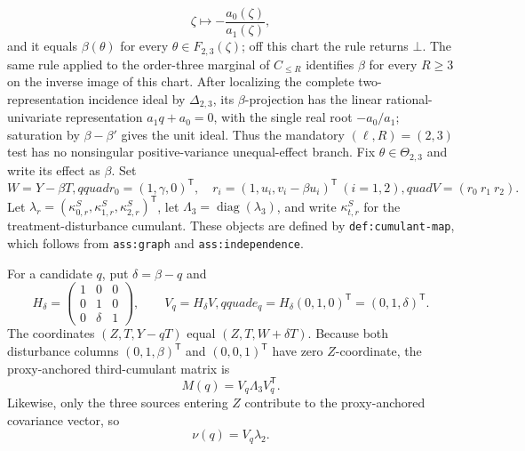 \[
 \zeta\longmapsto -\frac{a_0(\zeta)}{a_1(\zeta)},
\]
and it equals \(\beta(\theta)\) for every \(\theta\in F_{2,3}(\zeta)\); off this chart the rule returns \(\bot\).  The same rule applied to the order-three marginal of \(C_{\le R}\) identifies \(\beta\) for every \(R\ge3\) on the inverse image of this chart.  After localizing the complete two-representation incidence ideal by \(\Delta_{2,3}\), its \(\beta\)-projection has the linear rational-univariate representation \(a_1q+a_0=0\), with the single real root \(-a_0/a_1\); saturation by \(\beta-\beta'\) gives the unit ideal.  Thus the mandatory \((\ell,R)=(2,3)\) test has no nonsingular positive-variance unequal-effect branch.
Fix \(\theta\in\Theta_{2,3}\) and write its effect as \(\beta\).  Set
\[
 W=Y-\beta T,qquad
 r_0=(1,\gamma,0)^{\mathsf T},\quad
 r_i=(1,u_i,v_i-\beta u_i)^{\mathsf T}\ (i=1,2),quad
 V=(r_0\ r_1\ r_2).
\]
Let \(\lambda_r=(\kappa^S_{0,r},\kappa^S_{1,r},\kappa^S_{2,r})^{\mathsf T}\), let \(\Lambda_3=\operatorname{diag}(\lambda_3)\), and write \(\kappa^S_{t,r}\) for the treatment-disturbance cumulant.  These objects are defined by \texttt{def:cumulant-map}, which follows from \texttt{ass:graph} and \texttt{ass:independence}.

For a candidate \(q\), put \(\delta=\beta-q\) and
\[
 H_\delta=\begin{pmatrix}1&0&0\\0&1&0\\0&\delta&1\end{pmatrix},
 \qquad V_q=H_\delta V,qquad e_q=H_\delta(0,1,0)^{\mathsf T}=(0,1,\delta)^{\mathsf T}.
\]
The coordinates \((Z,T,Y-qT)\) equal \((Z,T,W+\delta T)\).  Because both disturbance columns \((0,1,\beta)^{\mathsf T}\) and \((0,0,1)^{\mathsf T}\) have zero \(Z\)-coordinate, the proxy-anchored third-cumulant matrix is
\[
 M(q)=V_q\Lambda_3V_q^{\mathsf T}. \tag{1}
\]
Likewise, only the three sources entering \(Z\) contribute to the proxy-anchored covariance vector, so
\[
 \nu(q)=V_q\lambda_2. \tag{2}
\]

